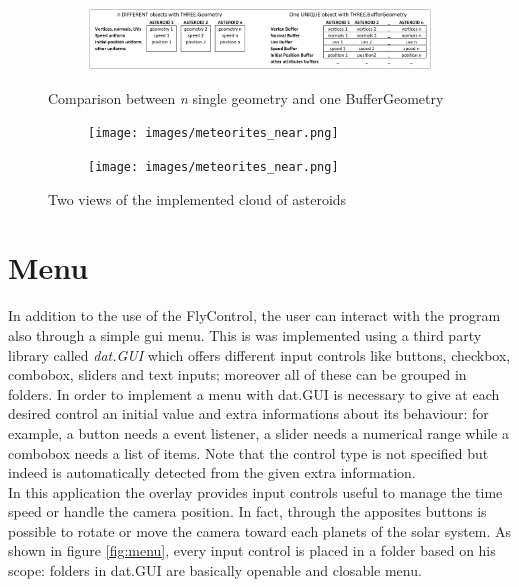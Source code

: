 \documentclass[paper=a4, fontsize=11pt]{scrartcl} %
\numberwithin{equation}{section} %
\numberwithin{figure}{section} %
\numberwithin{table}{section} %
\theoremstyle{definition}
\begin{document}
\begin{figure}
	\centering
	\begin{subfigure}{\textwidth}
		\centering
		\includegraphics[width=1.0\linewidth]{images/asteroids_geometry.png}
	\end{subfigure}
	\caption{Comparison between \textit{n} single geometry and one BufferGeometry}
	\label{fig:buffer_geometry}
\end{figure}
\newline
\begin{figure}
	\centering
	\begin{subfigure}{.4\textwidth}
		\centering
		\texttt{[image: images/meteorites\_near.png]}
	\end{subfigure}
	\begin{subfigure}{.4\textwidth}
		\centering
		\texttt{[image: images/meteorites\_near.png]}
	\end{subfigure}
	\caption{Two views of the implemented cloud of asteroids}
	\label{fig:meteorites}
\end{figure}

\section{Menu}

In addition to the use of the FlyControl, the user can interact with the program also through a simple gui menu. This is was implemented using a third party library called \textit{dat.GUI} \cite{datgui} which offers different input controls like buttons, checkbox, combobox, sliders and text inputs; moreover all of these can be grouped in folders. In order to implement a menu with dat.GUI is necessary to give at each desired control an initial value and extra informations about its behaviour: for example, a button needs a event listener, a slider needs a numerical range while a combobox needs a list of items. Note that the control type is not specified but indeed is automatically detected from the given extra information.\\
In this application the overlay provides input controls useful to manage the time speed or handle the camera position. In fact, through the apposites buttons is possible to rotate or move the camera toward each planets of the solar system.
As shown in figure \ref{fig:menu}, every input control is placed in a folder based on his scope: folders in dat.GUI are basically openable and closable menu.\\
\end{document}
